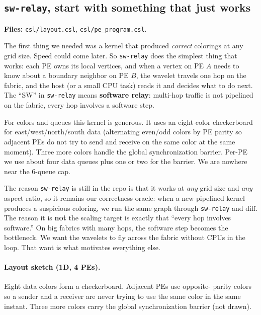 \documentclass[11pt]{article}
\newcommand{\code}[1]{\texttt{#1}}
\newcommand{\file}[1]{\texttt{#1}}
\begin{document}
\subsection{\code{sw-relay}, start with something that just works}
\textbf{Files:} \file{csl/layout.csl}, \file{csl/pe\_program.csl}.

The first thing we needed was a kernel that produced
\emph{correct} colorings at any grid size. Speed could come
later. So \code{sw-relay} does the simplest thing that works:
each PE owns its local vertices, and when a vertex on PE $A$
needs to know about a boundary neighbor on PE $B$, the wavelet
travels one hop on the fabric, and the host (or a small CPU
task) reads it and decides what to do next. The ``SW'' in
\code{sw-relay} means \textbf{software relay}: multi-hop traffic
is not pipelined on the fabric, every hop involves a software
step.

For colors and queues this kernel is generous. It uses an
eight-color checkerboard for east/west/north/south data
(alternating even/odd colors by PE parity so adjacent PEs do not
try to send and receive on the same color at the same moment).
Three more colors handle the global synchronization barrier.
Per-PE we use about four data queues plus one or two for the
barrier. We are nowhere near the 6-queue cap.

The reason \code{sw-relay} is still in the repo is that it works
at \emph{any} grid size and \emph{any} aspect ratio, so it
remains our correctness oracle: when a new pipelined kernel
produces a suspicious coloring, we run the same graph through
\code{sw-relay} and diff. The reason it is \textbf{not} the
scaling target is exactly that ``every hop involves software.''
On big fabrics with many hops, the software step becomes the
bottleneck. We want the wavelets to fly across the fabric without
CPUs in the loop. That want is what motivates everything else.

\paragraph{Layout sketch (1D, 4 PEs).}
Eight data colors form a checkerboard. Adjacent PEs use opposite-
parity colors so a sender and a receiver are never trying to use
the same color in the same instant. Three more colors carry the
global synchronization barrier (not drawn).
\end{document}
